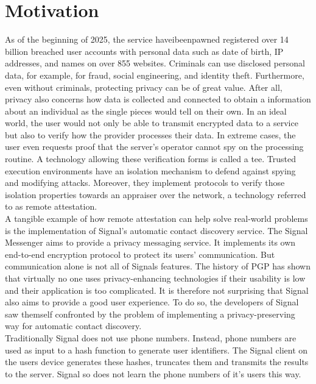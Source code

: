 \section{Motivation}
\label{sec:10:motivation}
As of the beginning of 2025, the service haveibeenpawned registered over 14
billion breached user accounts with personal data such as date of birth, IP
addresses, and names on over 855 websites.\cite{haveibeenpawned} Criminals can
use disclosed personal data, for example, for fraud, social engineering, and
identity theft. Furthermore, even without criminals, protecting privacy can be
of great value. After all, privacy also concerns how data is collected and
connected to obtain a information about an individual as the single pieces would
tell on their own.\cite{solove2007ve} In an ideal world, the user would not only
be able to transmit encrypted data to a service but also to verify how the
provider processes their data. In extreme cases, the user even requests proof
that the server's operator cannot spy on the processing routine. A technology
allowing these verification forms is called a \gls{tee}. Trusted execution
environments have an isolation mechanism to defend against spying and modifying
attacks. Moreover, they implement protocols to verify those isolation properties
towards an appraiser over the network, a technology referred to as remote
attestation. \\

A tangible example of how remote attestation can help solve real-world problems
is the implementation of Signal's automatic contact discovery service. The
Signal Messenger aims to provide a privacy messaging service. It implements its
own end-to-end encryption protocol to protect its users'
communication.\cite{cohn2020formal} But communication alone is not all of
Signals features. The history of PGP has shown that virtually no one uses
privacy-enhancing technologies if their usability is low and their application
is too complicated.\cite{ruoti2015johnny} It is therefore not surprising that
Signal also aims to provide a good user experience. To do so, the developers of
Signal saw themself confronted by the problem of implementing a
privacy-preserving way for automatic contact discovery.\cite{SignalCd}\\

Traditionally Signal does not use phone numbers. Instead, phone numbers are used
as input to a hash function to generate user identifiers. The Signal client on
the users device generates these hashes, truncates them and transmits the
results to the server. Signal so does not learn the phone numbers of it's users
this way.\\

